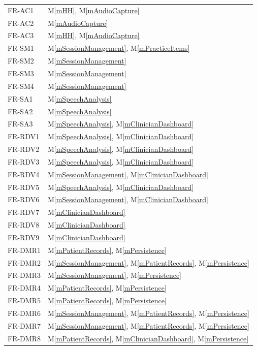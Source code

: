 \documentclass[12pt, titlepage]{article}
\newcommand{\mref}[1]{M\ref{#1}}
\begin{document}
\begin{longtable}{p{} p{}}
FR-AC1  & \mref{mHH}, \mref{mAudioCapture}\\
FR-AC2  & \mref{mAudioCapture}\\
FR-AC3  & \mref{mHH}, \mref{mAudioCapture}\\
\midrule
FR-SM1  & \mref{mSessionManagement}, \mref{mPracticeItems}\\
FR-SM2  & \mref{mSessionManagement}\\
FR-SM3  & \mref{mSessionManagement}\\
FR-SM4  & \mref{mSessionManagement}\\
\midrule
FR-SA1  & \mref{mSpeechAnalysis}\\
FR-SA2  & \mref{mSpeechAnalysis}\\
FR-SA3  & \mref{mSpeechAnalysis}, \mref{mClinicianDashboard}\\
\midrule
FR-RDV1 & \mref{mSpeechAnalysis}, \mref{mClinicianDashboard}\\
FR-RDV2 & \mref{mSpeechAnalysis}, \mref{mClinicianDashboard}\\
FR-RDV3 & \mref{mSpeechAnalysis}, \mref{mClinicianDashboard}\\
FR-RDV4 & \mref{mSessionManagement}, \mref{mClinicianDashboard}\\
FR-RDV5 & \mref{mSpeechAnalysis}, \mref{mClinicianDashboard}\\
FR-RDV6 & \mref{mSessionManagement}, \mref{mClinicianDashboard}\\
FR-RDV7 & \mref{mClinicianDashboard}\\
FR-RDV8 & \mref{mClinicianDashboard}\\
FR-RDV9 & \mref{mClinicianDashboard}\\
\midrule
FR-DMR1  & \mref{mPatientRecords}, \mref{mPersistence}\\
FR-DMR2  & \mref{mSessionManagement}, \mref{mPatientRecords}, \mref{mPersistence}\\
FR-DMR3  & \mref{mSessionManagement}, \mref{mPersistence}\\
FR-DMR4  & \mref{mPatientRecords}, \mref{mPersistence}\\
FR-DMR5  & \mref{mPatientRecords}, \mref{mPersistence}\\
FR-DMR6  & \mref{mSessionManagement}, \mref{mPatientRecords}, \mref{mPersistence}\\
FR-DMR7  & \mref{mSessionManagement}, \mref{mPatientRecords}, \mref{mPersistence}\\
FR-DMR8  & \mref{mPatientRecords}, \mref{mClinicianDashboard}, \mref{mPersistence}\\

\end{longtable}
\end{document}
